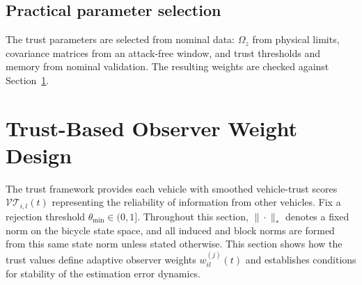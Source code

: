 \documentclass[letterpaper,journal]{IEEEtran}
\def\VT{\mathcal{VT}} %
\def\O{\mathcal{O}} %
\begin{document}
\subsection{Practical parameter selection}\label{subsec_trust_tuning}
The trust parameters are selected from nominal data: $\Omega_z$ from physical limits, covariance matrices from an attack-free window, and trust thresholds and memory from nominal validation. The resulting weights are checked against Section~\ref{sec_weight_design}.



\section{Trust-Based Observer Weight Design}\label{sec_weight_design}
The trust framework provides each vehicle with smoothed vehicle-trust scores $\VT_{i,l}(t)$ representing the reliability of information from other vehicles.
Fix a rejection threshold $\theta_{\min}\in(0,1]$. Throughout this section, $\|\cdot\|_*$ denotes a fixed norm on the bicycle state space, and all induced and block norms are formed from this same state norm unless stated otherwise.
This section shows how the trust values define adaptive observer weights $w_{il}^{(j)}(t)$ and establishes conditions for stability of the estimation error dynamics.
\end{document}
